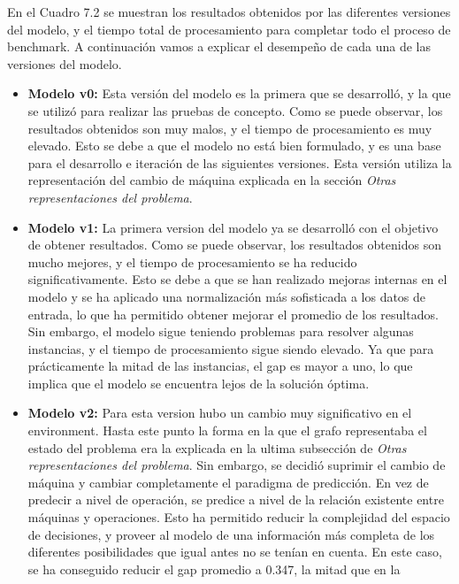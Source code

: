 En el Cuadro 7.2 se muestran los resultados obtenidos por las
diferentes versiones del modelo, y el tiempo total de procesamiento
para completar todo el proceso de benchmark. A continuación vamos a
explicar el desempeño de cada una de las versiones del modelo.
\begin{itemize}
    \item \textbf{Modelo v0:} Esta versión del modelo es la primera que se
        desarrolló, y la que se utilizó para realizar las pruebas de
        concepto. Como se puede observar, los resultados obtenidos son
        muy malos, y el tiempo de procesamiento es muy elevado. Esto
        se debe a que el modelo no está bien formulado, y es una base
        para el desarrollo e iteración de las siguientes versiones. Esta versión
        utiliza la representación del cambio de máquina explicada en la
        sección \textit{Otras representaciones del problema}.
    \item \textbf{Modelo v1:} La primera version del modelo ya se desarrolló 
        con el objetivo de obtener resultados. Como se
        puede observar, los resultados obtenidos son mucho mejores, y el
        tiempo de procesamiento se ha reducido significativamente. Esto se 
        debe a que se han realizado mejoras internas en el modelo y se ha aplicado una
        normalización más sofisticada a los datos de entrada, lo que
        ha permitido obtener mejorar el promedio de los resultados. Sin 
        embargo, el modelo sigue teniendo problemas para resolver algunas
        instancias, y el tiempo de procesamiento sigue siendo elevado. Ya que
        para prácticamente la mitad de las instancias, el gap es mayor a uno,
        lo que implica que el modelo se encuentra lejos de la solución óptima.
    \item \textbf{Modelo v2:} Para esta version hubo un cambio muy significativo 
        en el environment. Hasta este punto la forma en la que el grafo representaba
        el estado del problema era la explicada en la ultima subsección de
        \textit{Otras representaciones del problema}. Sin embargo, se decidió suprimir 
        el cambio de máquina y cambiar completamente el paradigma de predicción. En vez
        de predecir a nivel de operación, se predice a nivel de la relación existente 
        entre máquinas y operaciones. Esto ha permitido reducir la complejidad del 
        espacio de decisiones, y proveer al modelo de una información más completa de
        los diferentes posibilidades que igual antes no se tenían en cuenta. En este
        caso, se ha conseguido reducir el gap promedio a 0.347, la mitad que en la

\end{itemize}
